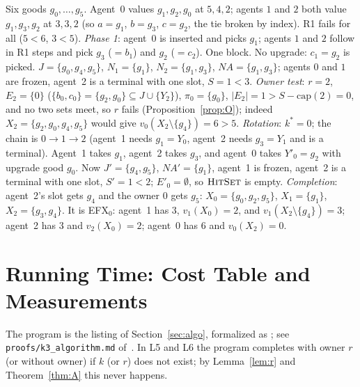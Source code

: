 \documentclass[runningheads,11pt]{llncs}
\newcommand{\efxz}{\texorpdfstring{\mbox{EFX$_0$}}{EFX0}}
\newcommand{\NA}{\mathit{NA}}
\newcommand{\capa}{\mathrm{cap}}
\begin{document}
\begin{example}\label{ex:rot}
Six goods $g_0,\dots,g_5$. Agent~0 values $g_1,g_2,g_0$ at $5,4,2$; agents $1$ and $2$ both value $g_1,g_3,g_2$ at $3,3,2$ (so $a=g_1$, $b=g_3$, $c=g_2$, the tie broken by index). R1 fails for all ($5<6$, $3<5$). \emph{Phase 1}: agent~0 is inserted and picks $g_1$; agents $1$ and $2$ follow in R1 steps and pick $g_3$ ($=b_1$) and $g_2$ ($=c_2$). One block. No upgrade: $c_1=g_2$ is picked. $J=\{g_0,g_4,g_5\}$, $N_1=\{g_1\}$, $N_2=\{g_1,g_3\}$, $\NA=\{g_1,g_3\}$; agents $0$ and $1$ are frozen, agent~2 is a terminal with one slot, $S=1<3$. \emph{Owner test}: $r=2$, $E_2=\{0\}$ ($\{b_0,c_0\}=\{g_2,g_0\}\subseteq J\cup\{Y_2\}$), $\pi_0=\{g_0\}$, $|E_2|=1>S-\capa(2)=0$, and no two sets meet, so $r$ fails (Proposition~\ref{prop:O}); indeed $X_2=\{g_2,g_0,g_4,g_5\}$ would give $v_0(X_2\setminus\{g_4\})=6>5$. \emph{Rotation}: $k^*=0$; the chain is $0\to1\to2$ (agent~1 needs $g_1=Y_0$, agent~2 needs $g_3=Y_1$ and is a terminal). Agent~1 takes $g_1$, agent~2 takes $g_3$, and agent~0 takes $Y'_0=g_2$ with upgrade good $g_0$. Now $J'=\{g_4,g_5\}$, $\NA'=\{g_1\}$, agent~1 is frozen, agent~2 is a terminal with one slot, $S'=1<2$; $E'_0=\emptyset$, so $\textsc{HitSet}$ is empty. \emph{Completion}: agent~2's slot gets $g_4$ and the owner $0$ gets $g_5$: $X_0=\{g_0,g_2,g_5\}$, $X_1=\{g_1\}$, $X_2=\{g_3,g_4\}$. It is \efxz{}: agent~1 has $3$, $v_1(X_0)=2$, and $v_1(X_2\setminus\{g_4\})=3$; agent~2 has $3$ and $v_2(X_0)=2$; agent~0 has $6$ and $v_0(X_2)=0$.
\end{example}

\section{Running Time: Cost Table and Measurements}\label{app:algo}

The program is the listing of Section~\ref{sec:algo}, formalized as ; see \texttt{proofs/k3\_algorithm.md} of~\cite{Repo}. In L5 and L6 the program completes with owner $r$ (or without owner) if $k$ (or $r$) does not exist; by Lemma~\ref{lem:r} and Theorem~\ref{thm:A} this never happens.
\end{document}
